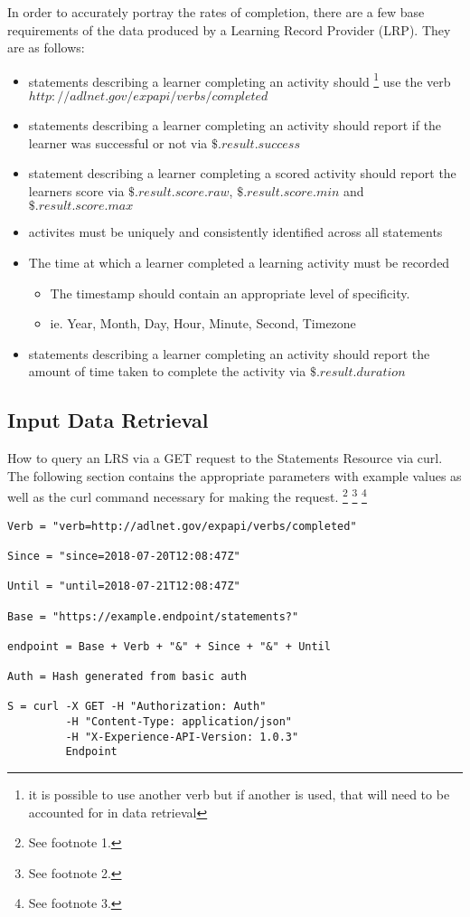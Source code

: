 \documentclass{article}
\begin{document}
In order to accurately portray the rates of completion, there
are a few base requirements of the data produced by a Learning Record
Provider (LRP). They are as follows:
\begin{itemize}
\item statements describing a learner completing an activity should
  \footnote{\label{verbIRICompletion} it is possible to use another
    verb but if another is used, that will need to be accounted for
    in data retrieval}
  use the verb $http://adlnet.gov/expapi/verbs/completed$
\item statements describing a learner completing an activity should
  report if the learner was successful or not via
  $\$.result.success$
\item statement describing a learner completing a scored activity
  should report the learners score via $\$.result.score.raw$,
  $\$.result.score.min$ and $\$.result.score.max$
\item activites must be uniquely and consistently identified across
  all statements
\item The time at which a learner completed a learning activity must be recorded
  \begin{itemize}
  \item The timestamp should contain an appropriate level of specificity.
  \item ie. Year, Month, Day, Hour, Minute, Second, Timezone
  \end{itemize}
\item statements describing a learner completing an activity should
  report the amount of time taken to complete the activity via $\$.result.duration$
\end{itemize}

\subsection{Input Data Retrieval}

How to query an LRS via a GET request to the Statements Resource via
curl. The following section contains the appropriate parameters with
example values as well as the curl command necessary for making the request.
\footnote{\label{refMoreLink2} See footnote 1.}
\footnote{\label{refnoZ2} See footnote 2.}
\footnote{\label{refallTime2} See footnote 3.}

\begin{lstlisting}[frame=single]
Verb = "verb=http://adlnet.gov/expapi/verbs/completed"

Since = "since=2018-07-20T12:08:47Z"

Until = "until=2018-07-21T12:08:47Z"

Base = "https://example.endpoint/statements?"

endpoint = Base + Verb + "&" + Since + "&" + Until

Auth = Hash generated from basic auth

S = curl -X GET -H "Authorization: Auth"
         -H "Content-Type: application/json"
         -H "X-Experience-API-Version: 1.0.3"
         Endpoint
\end{lstlisting}
\end{document}
